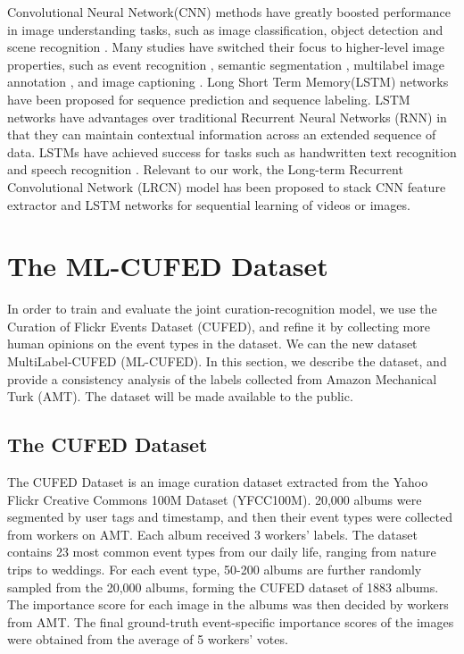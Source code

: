 \documentclass[runningheads]{llncs}
\begin{document}
Convolutional Neural Network(CNN) methods have greatly boosted performance in image understanding tasks, such as image classification, object detection and scene recognition \cite{imagenet, googlenet, rcnn, places}. Many studies have switched their focus to higher-level image properties, such as event recognition \cite{event_recognition}, semantic segmentation \cite{long_shelhamer_fcn},  multilabel image annotation \cite{tagging}, and image captioning \cite{lrcn}. Long Short Term Memory(LSTM) networks \cite{lstm} have been proposed for sequence prediction and sequence labeling. LSTM networks have advantages over traditional Recurrent Neural Networks (RNN) in that they can maintain contextual information across  an extended sequence of data. LSTMs have achieved success for tasks such as handwritten text recognition \cite{Graves} and speech recognition \cite{speech}. Relevant to our work, the Long-term Recurrent Convolutional Network (LRCN) model \cite{lrcn} has been proposed to stack CNN feature extractor and LSTM networks for sequential learning of videos or images.


\section{The ML-CUFED Dataset}
In order to train and evaluate the joint curation-recognition model, we use the Curation of Flickr Events Dataset (CUFED), and refine it by collecting more human opinions on the event types in the dataset. We can the new dataset MultiLabel-CUFED (ML-CUFED). In this section, we describe the dataset, and provide a consistency analysis of the labels collected from Amazon Mechanical Turk (AMT). The dataset will be made available to the public.
\subsection{The CUFED Dataset}
The CUFED Dataset is an image curation dataset extracted from the Yahoo Flickr Creative Commons 100M Dataset (YFCC100M). 20,000 albums were segmented by user tags and timestamp, and then their event types were collected from workers on AMT. Each album received 3 workers' labels. The dataset contains 23 most common event types from our daily life, ranging from nature trips to weddings. For each event type, 50-200 albums are further randomly sampled from the 20,000 albums, forming the CUFED dataset of 1883 albums. The importance score for each image in the albums was then decided by workers from AMT. The final ground-truth event-specific importance scores of the images were obtained from the average of 5 workers' votes.
\end{document}

